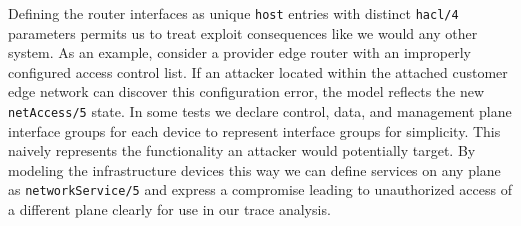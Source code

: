 Defining the router interfaces as unique \verb|host| entries with distinct \verb|hacl/4| parameters permits us to treat exploit consequences like we would any other system. As an example, consider a provider edge router with an improperly configured access control list. If an attacker located within the attached customer edge network can discover this configuration error, the model reflects the new \verb|netAccess/5| state. In some tests we declare control, data, and management plane interface groups for each device to represent interface groups for simplicity. This naively represents the functionality an attacker would potentially target. By modeling the infrastructure devices this way we can define services on any plane as \verb|networkService/5| and express a compromise leading to unauthorized access of a different plane clearly for use in our trace analysis. 

